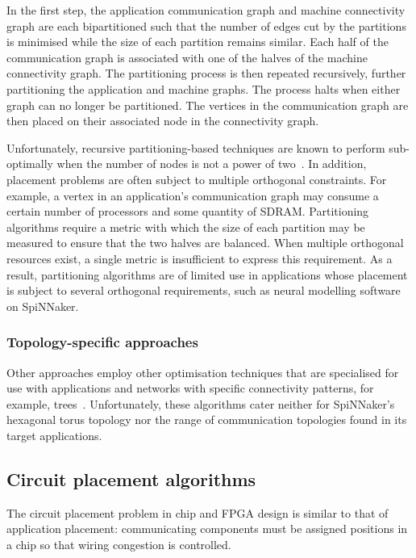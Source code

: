				In the first step, the application communication graph and machine
				connectivity graph are each bipartitioned such that the number of edges
				cut by the partitions is minimised while the size of each partition
				remains similar. Each half of the communication graph is associated
				with one of the halves of the machine connectivity graph.  The
				partitioning process is then repeated recursively, further partitioning
				the application and machine graphs. The process halts when either graph
				can no longer be partitioned.  The vertices in the communication graph
				are then placed on their associated node in the connectivity graph.
				
				Unfortunately, recursive partitioning-based techniques are known to
				perform sub-optimally when the number of nodes is not a power of
				two~\cite{simon97}. In addition, placement problems are often subject
				to multiple orthogonal constraints. For example, a vertex in an
				application's communication graph may consume a certain number of
				processors and some quantity of SDRAM. Partitioning algorithms require
				a metric with which the size of each partition may be measured to
				ensure that the two halves are balanced. When multiple orthogonal
				resources exist, a single metric is insufficient to express this
				requirement. As a result, partitioning algorithms are of limited use in
				applications whose placement is subject to several orthogonal
				requirements, such as neural modelling software on SpiNNaker.
				
			\subsubsection{Topology-specific approaches}
				
				Other approaches employ other optimisation techniques that are
				specialised for use with applications and networks with specific
				connectivity patterns, for example, trees~\cite{jeannot14,traff02}.
				Unfortunately, these algorithms cater neither for SpiNNaker's hexagonal
				torus topology nor the range of communication topologies found in its
				target applications.
	
		\subsection{Circuit placement algorithms}
			
			The circuit placement problem in chip and FPGA design is similar to that
			of application placement: communicating components must be assigned
			positions in a chip so that wiring congestion is controlled.
			
